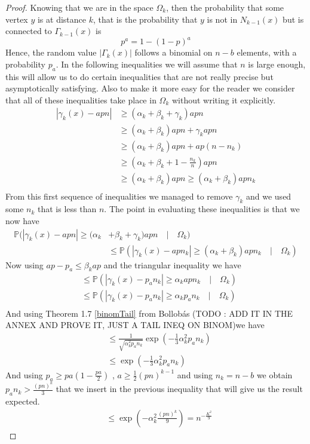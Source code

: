 \begin{proof}
	Knowing that we are in the space $\Omega_k$, then the probability that some vertex $y$ is at distance $k$, that is the probability that $y$ is not in $N_{k-1}(x)$ but is connected to $\Gamma_{k-1}(x)$ is 
	\begin{equation}
		p^a = 1 - (1-p)^a
	\end{equation}
	Hence, the random value $|\Gamma_k(x)|$ follows a binomial on $n-b$ elements, with a probability $p_a$.
	In the following inequalities we will assume that $n$ is large enough, this will allow us to do certain inequalities that are not really precise but asymptotically satisfying. Also to make it more easy for the reader we consider that all of these inequalities take place in $\Omega_k$ without writing it explicitly.
	\begin{align}
		|\gamma_k(x) - apn| &\geq (\alpha_k + \beta_k + \gamma_k)apn \\
		 &\geq (\alpha_k + \beta_k)apn + \gamma_k apn \\
		 &\geq (\alpha_k + \beta_k)apn + ap(n-n_k) \\ 
		 &\geq (\alpha_k + \beta_k + 1 - \frac{n_k}{n})apn \\ 
		 &\geq (\alpha_k + \beta_k)apn \geq (\alpha_k + \beta_k)apn_k\\ 
	\end{align}
	From this first sequence of inequalities we managed to remove $\gamma_k$ and we used some $n_k$ that is less than $n$.
	The point in evaluating these inequalities is that we now have
	\begin{align}
		\mathbb{P}(|\gamma_k(x) - apn| \geq (\alpha_k &+ \beta_k + \gamma_k)apn \quad|\quad \Omega_k) \\&\leq \mathbb{P}(|\gamma_k(x) - apn_k| \geq (\alpha_k + \beta_k )apn_k \quad|\quad \Omega_k)
	\end{align}
	Now using $ap -p_a \leq \beta_k ap$ and the triangular inequality we have
	\begin{align}
		&\leq \mathbb{P}(|\gamma_k(x) - p_an_k| \geq \alpha_k apn_k \quad|\quad \Omega_k)\\
		&\leq \mathbb{P}(|\gamma_k(x) - p_an_k| \geq \alpha_k p_an_k \quad|\quad \Omega_k)\\
	\end{align}
	And using Theorem 1.7 \ref{binomTail} from Bollob\'as (TODO : ADD IT IN THE ANNEX AND PROVE IT, JUST A TAIL INEQ ON BINOM)we have
	\begin{align}
		&\leq \frac{1}{\sqrt{\alpha_k^2p_an_k}}\exp(-\frac{1}{3}\alpha_k^2p_an_k) \\
		&\leq \exp(-\frac{1}{3}\alpha_k^2p_an_k)
	\end{align}
	And using $p_a \geq pa(1-\frac{pa}{2})$ , $a \geq \frac{1}{2}(pn)^{k-1}$ and using $n_k = n-b$ we obtain $p_an_k > \frac{(pn)^k}{3}$ that we insert in the previous inequality that will give us the result expected.
	\begin{align}
		&\leq \exp(-\alpha_k^2\frac{(pn)^k}{9}) = n^{-\frac{K^2}{9}}
	\end{align}
\end{proof}
